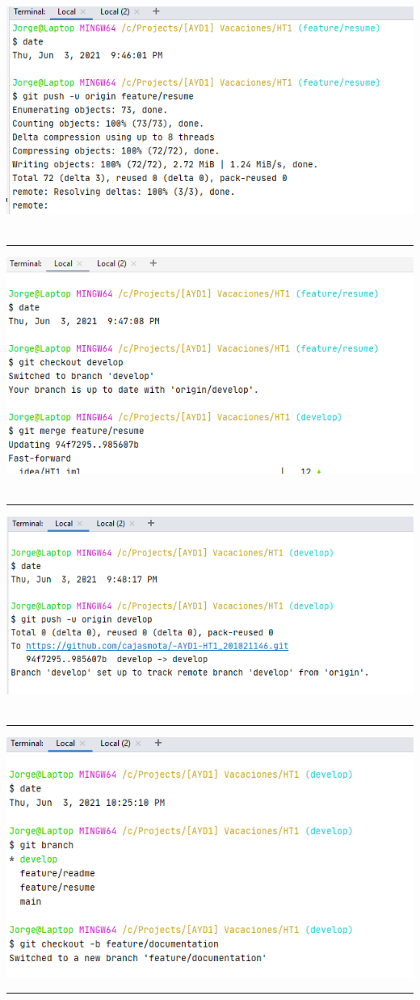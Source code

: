 \documentclass[12pt,letterpaper]{article}
\begin{document}
	\includegraphics{7.PNG} \\\\
	\hrule 
	\vspace{1cm}
	\includegraphics{8.PNG} \\\\
	\hrule 
	\vspace{1cm}
	\includegraphics{9.PNG} \\\\
	\hrule 
	\vspace{1cm}
	\includegraphics{10.PNG}
	\hrule 
	
	
\end{document}

